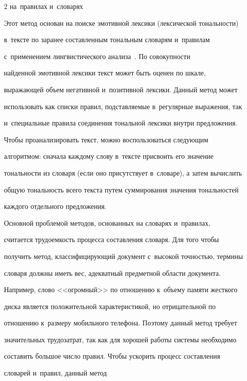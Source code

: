 \begin{multicols}{2}
{на~правилах и~словарях}



  Этот метод основан на поиске эмотивной лексики (лексической тональности) 

в~тексте по заранее составленным тональным словарям и~правилам 

с~применением лингвистического анализа~\cite{11-sig}. По совокупности 

найденной эмотивной лексики текст может быть оценен по шкале, 

выражающей объем негативной и~позитивной лексики. Данный метод может 

использовать как списки правил, под\-став\-ля\-емые в~регулярные выражения, так 

и~специальные правила соединения тональной лексики внутри предложения. 

Чтобы проанализировать текст, можно воспользоваться следующим 

алгоритмом: сначала каждому слову в~тексте присвоить его значение 

тональности из словаря (если оно присутствует в~словаре), а затем вычислить 

общую тональность всего текста путем суммирования значения тональностей 

каждого отдельного предложения.





  

  Основной проблемой методов, основанных на словарях и~правилах, 

считается трудоемкость процесса составления словаря. Для того чтобы 

получить метод, классифицирующий документ с~высокой точностью, термины 

словаря должны иметь вес, адекватный предметной области документа. 

Например, слово <<огромный>> по отношению к~объему памяти жесткого 

диска является положительной характеристикой, но отрицательной по 

отношению к~размеру мобильного телефона. Поэтому данный метод требует 

значительных трудозатрат, так как для хорошей работы системы необходимо 

составить большое число правил. Чтобы ускорить процесс составления 

словарей и~правил, данный метод\linebreak\vspace*{-12pt}



\pagebreak



\end{multicols}




